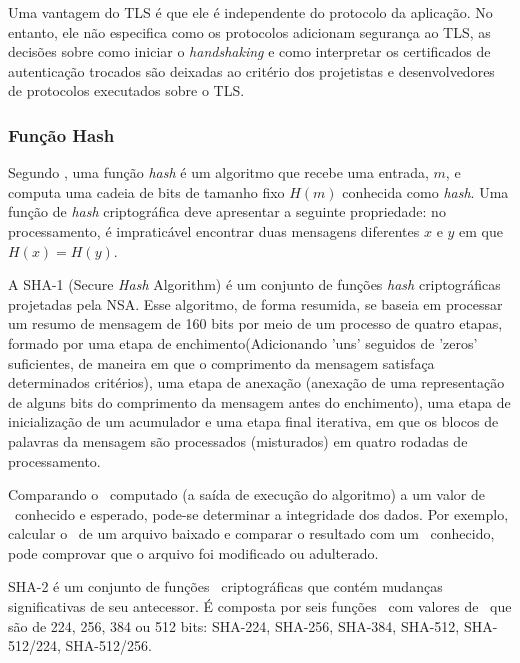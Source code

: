 Uma vantagem do TLS é que ele é independente do protocolo da aplicação. No entanto, ele não especifica como os protocolos adicionam segurança ao TLS, as decisões sobre como iniciar o \textit{handshaking} e como interpretar os certificados de autenticação trocados são deixadas ao critério dos projetistas e desenvolvedores de protocolos executados sobre o TLS.

\subsubsection{Função Hash}

Segundo , uma função \textit{hash} é um algoritmo que recebe uma entrada, $m$, e computa uma cadeia de bits de tamanho fixo $H(m)$ conhecida como \textit{hash}. Uma função de \textit{hash} criptográfica deve apresentar a seguinte propriedade:
no processamento, é impraticável encontrar duas mensagens diferentes $x$ e $y$ em que $H(x)=H(y)$.

A SHA-1 (Secure \textit{Hash} Algorithm) é um conjunto de funções \textit{hash} criptográficas projetadas pela NSA\cite{NSA}. Esse algoritmo, de forma resumida, se baseia em processar um resumo de mensagem de 160 bits por meio de um processo de quatro etapas, formado por uma etapa de enchimento(Adicionando 'uns' seguidos de 'zeros' suficientes, de maneira em que o comprimento da mensagem satisfaça determinados critérios), uma etapa de anexação (anexação de uma representação de alguns bits do comprimento da mensagem antes do enchimento), uma etapa de inicialização de um acumulador e uma etapa final iterativa, em que os blocos de palavras da mensagem são processados (misturados) em quatro rodadas de processamento. 

Comparando o \hash\ computado (a saída de execução do algoritmo) a um valor de \hash\ conhecido e esperado, pode-se determinar a integridade dos dados. Por exemplo, calcular o \hash\ de um arquivo baixado e comparar o resultado com um \hash\ conhecido, pode comprovar que o arquivo foi modificado ou adulterado.

SHA-2 é um conjunto de funções \hash\ criptográficas que contém mudanças significativas de seu antecessor. É composta por seis funções \hash\ com valores de \hash\ que são de 224, 256, 384 ou 512 bits: SHA-224, SHA-256, SHA-384, SHA-512, SHA-512/224, SHA-512/256.



